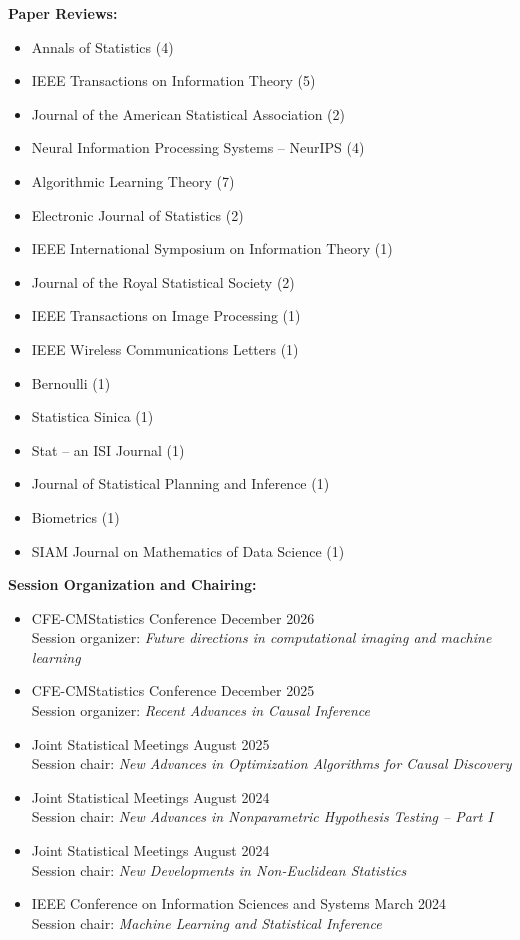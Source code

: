\documentclass[letterpaper,oneside]{article}
\begin{document}
\noindent\textbf{Paper Reviews:}
\begin{itemize}
  \item Annals of Statistics (4)
  \item IEEE Transactions on Information Theory (5)
  \item Journal of the American Statistical Association (2)
  \item Neural Information Processing Systems -- NeurIPS (4) 
  \item Algorithmic Learning Theory (7)
  \item Electronic Journal of Statistics (2)
  \item IEEE International Symposium on Information Theory (1)
  \item Journal of the Royal Statistical Society (2)
  \item IEEE Transactions on Image Processing (1)
  \item IEEE Wireless Communications Letters (1)
  \item Bernoulli (1)
  \item Statistica Sinica (1)
  \item Stat -- an ISI Journal (1)
  \item Journal of Statistical Planning and Inference (1)
  \item Biometrics (1)
  \item SIAM Journal on Mathematics of Data Science (1)
\end{itemize}

\noindent\textbf{Session Organization and Chairing:}
\begin{itemize}[leftmargin=0pt, label={}]
  
  \item CFE-CMStatistics Conference \hfill December 2026 \\
  Session organizer: \textit{Future directions in computational imaging and machine learning }
  
  \item CFE-CMStatistics Conference \hfill December 2025\\ 
  Session organizer: \textit{Recent Advances in Causal Inference}
  \item Joint Statistical Meetings \hfill August 2025\\
  Session chair: \textit{New Advances in Optimization Algorithms for Causal Discovery}
  \item Joint Statistical Meetings  \hfill August 2024\\
  Session chair: \textit{New Advances in Nonparametric Hypothesis Testing -- Part I}
  \item Joint Statistical Meetings \hfill August 2024\\ 
  Session chair: \textit{New Developments in Non-Euclidean Statistics}
  \item IEEE Conference on Information Sciences and Systems \hfill March 2024\\ 
  Session chair: \textit{Machine Learning and Statistical Inference}
\end{itemize}
\end{document}

